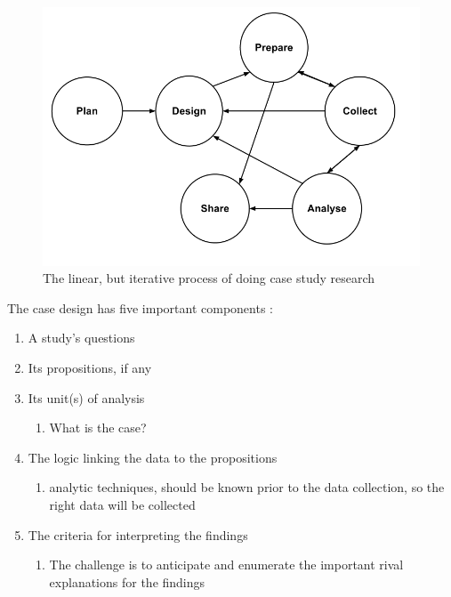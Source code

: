 \begin{figure}[H]
\begin{center}
\includegraphics[scale=0.38]{caseProcess.png}
\caption[Case Study Research Process]{The linear, but iterative process of doing case study research \cite{CaseStudyResearch}}
\label{fig:caseProcess}
\end{center}
\end{figure}

The case design has five important components \cite{CaseStudyResearch}:

\begin{enumerate}
\item A study's questions
\item Its propositions, if any
\item Its unit(s) of analysis
\begin{enumerate}
\item What is the case?
\end{enumerate}
\item The logic linking the data to the propositions
\begin{enumerate}
\item analytic techniques, should be known prior to the data collection, so the right data will be collected
\end{enumerate}
\item The  criteria for interpreting the findings
\begin{enumerate}
\item The challenge is to anticipate and enumerate the important rival explanations for the findings
\end{enumerate}
\end{enumerate}

